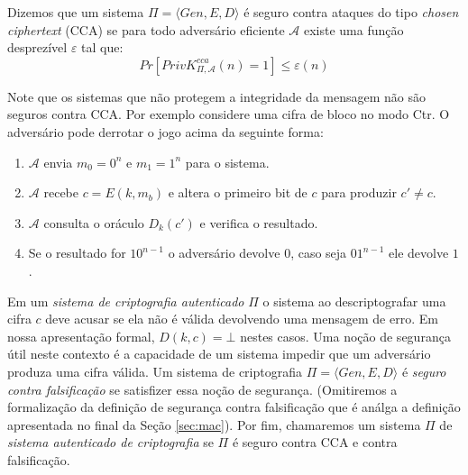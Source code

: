 Dizemos que um sistema $\Pi = \langle Gen, E, D \rangle$ é seguro contra ataques do tipo {\em chosen ciphertext} (CCA) se para todo adversário eficiente $\mathcal{A}$ existe uma função desprezível $\varepsilon$ tal que:
\begin{displaymath}
  Pr[PrivK^{cca}_{\Pi, \mathcal{A}}(n) = 1] \leq \varepsilon(n)
\end{displaymath}

Note que os sistemas que não protegem a integridade da mensagem não são seguros contra CCA.
Por exemplo considere uma cifra de bloco no modo Ctr.
O adversário pode derrotar o jogo acima da seguinte forma:
\begin{enumerate}
\item $\mathcal{A}$ envia $m_0 = 0^n$ e $m_1 = 1^n$ para o sistema.
\item $\mathcal{A}$ recebe $c = E(k, m_b)$ e altera o primeiro bit de $c$ para produzir $c' \neq c$.
\item $\mathcal{A}$ consulta o oráculo $D_k(c')$ e verifica o resultado.
\item Se o resultado for $10^{n-1}$ o adversário devolve $0$, caso seja $01^{n-1}$ ele devolve $1$.
\end{enumerate}

Em um {\em sistema de criptografia autenticado} $\Pi$ o sistema ao descriptografar uma cifra $c$ deve acusar se ela não é válida devolvendo uma mensagem de erro.
Em nossa apresentação formal, $D(k,c) = \bot$ nestes casos.
Uma noção de segurança útil neste contexto é a capacidade de um sistema impedir que um adversário produza uma cifra válida.
Um sistema de criptografia $\Pi = \langle Gen, E, D \rangle$ é {\em seguro contra falsificação} se satisfizer essa noção de segurança.
(Omitiremos a formalização da definição de segurança contra falsificação que é análga a definição apresentada no final da Seção \ref{sec:mac}).
Por fim, chamaremos um sistema $\Pi$ de {\em sistema autenticado de criptografia} se $\Pi$ é seguro contra CCA e contra falsificação.


